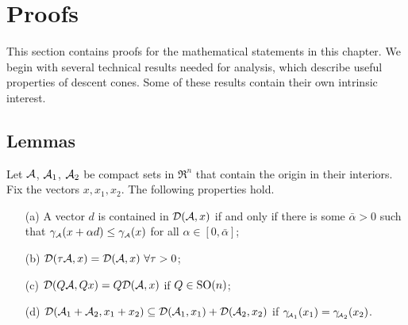 \section{Proofs} \label{sec:3-7}

This section contains proofs for the mathematical statements in this chapter. We begin with several technical results needed for analysis, which describe useful properties of descent cones. Some of these results contain their own intrinsic interest.

\subsection{Lemmas} \label{sec:3-7-1}

\begin{lemma}\label{prop-descent-cone-properties} Let $\mathcal{A}$, $\mathcal{A}_1$, $\mathcal{A}_2$ be compact sets in $\Re^n$ that contain the origin in their interiors. Fix the vectors $x, x_1, x_2$. The following properties hold.
    \begin{itemize}
     \item[(a)] \label{prop-descent-cone-properties-a}
       A vector $d$ is contained in $\mathcal{D}(\mathcal{A}, x)$ if and only if there is some $\bar\alpha > 0$ such that $\gamma_{\scriptscriptstyle\mathcal{A}}(x + \alpha d) \leq \gamma_{\scriptscriptstyle\mathcal{A}}(x)$ for all $\alpha \in [0, \bar\alpha]$;
     \item[(b)] \label{prop-descent-cone-properties-b}
       $\mathcal{D}(\tau\mathcal{A}, x) = \mathcal{D}(\mathcal{A}, x)\ \forall\tau > 0$;
     \item[(c)] \label{prop-descent-cone-properties-c}
       $\mathcal{D}(Q\mathcal{A}, Qx) = Q\mathcal{D}(\mathcal{A}, x)$ if $Q\in \operatorname{SO}(n)$;
     \item[(d)] \label{prop-descent-cone-properties-d}
       $\mathcal{D}(\mathcal{A}_1 + \mathcal{A}_2, x_1 + x_2) \subseteq \mathcal{D}(\mathcal{A}_1, x_1) + \mathcal{D}(\mathcal{A}_2, x_2)$ if $\gamma_{\!\scriptscriptstyle\mathcal{A}_1}(x_1) = \gamma_{\!\scriptscriptstyle\mathcal{A}_2}(x_2)$.
     \end{itemize}
\end{lemma} 

